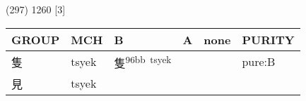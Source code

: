 \documentclass[14pt,a4paper]{scrartcl}
\begin{document}
(297) 1260 {[}3{]}

\begin{longtable}[c]{@{}llllll@{}}
\toprule
\begin{minipage}[b]{0.14\columnwidth}\raggedright\strut
GROUP
\strut\end{minipage} &
\begin{minipage}[b]{0.14\columnwidth}\raggedright\strut
MCH
\strut\end{minipage} &
\begin{minipage}[b]{0.14\columnwidth}\raggedright\strut
B
\strut\end{minipage} &
\begin{minipage}[b]{0.14\columnwidth}\raggedright\strut
A
\strut\end{minipage} &
\begin{minipage}[b]{0.14\columnwidth}\raggedright\strut
none
\strut\end{minipage} &
\begin{minipage}[b]{0.14\columnwidth}\raggedright\strut
PURITY
\strut\end{minipage}\tabularnewline
\midrule
\endhead
\begin{minipage}[t]{0.14\columnwidth}\raggedright\strut
隻
\strut\end{minipage} &
\begin{minipage}[t]{0.14\columnwidth}\raggedright\strut
tsyek
\strut\end{minipage} &
\begin{minipage}[t]{0.14\columnwidth}\raggedright\strut
隻\textsuperscript{96bb~tsyek}
\strut\end{minipage} &
\begin{minipage}[t]{0.14\columnwidth}\raggedright\strut
\strut\end{minipage} &
\begin{minipage}[t]{0.14\columnwidth}\raggedright\strut
\strut\end{minipage} &
\begin{minipage}[t]{0.14\columnwidth}\raggedright\strut
pure:B
\strut\end{minipage}\tabularnewline
\begin{minipage}[t]{0.14\columnwidth}\raggedright\strut
見
\strut\end{minipage} &
\begin{minipage}[t]{0.14\columnwidth}\raggedright\strut
tsyek
\strut\end{minipage} &
\begin{minipage}[t]{0.14\columnwidth}\raggedright\strut
\strut\end{minipage} &

\end{longtable}
\end{document}
